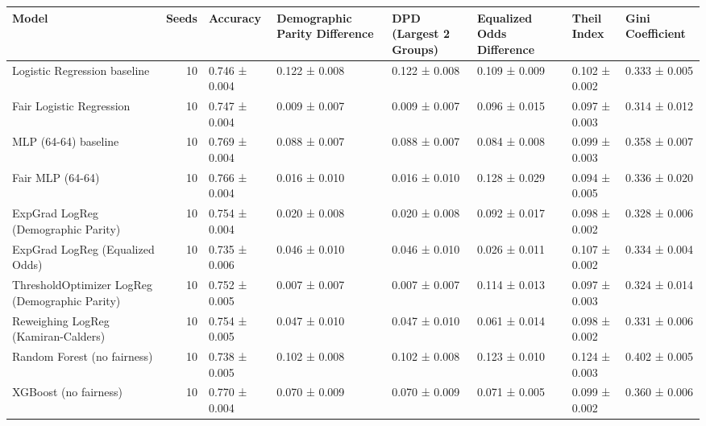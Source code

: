 \begin{tabular}{lrllllll}
\toprule
Model & Seeds & Accuracy & Demographic Parity Difference & DPD (Largest 2 Groups) & Equalized Odds Difference & Theil Index & Gini Coefficient \\
\midrule
Logistic Regression baseline & 10 & 0.746 ± 0.004 & 0.122 ± 0.008 & 0.122 ± 0.008 & 0.109 ± 0.009 & 0.102 ± 0.002 & 0.333 ± 0.005 \\
Fair Logistic Regression & 10 & 0.747 ± 0.004 & 0.009 ± 0.007 & 0.009 ± 0.007 & 0.096 ± 0.015 & 0.097 ± 0.003 & 0.314 ± 0.012 \\
MLP (64-64) baseline & 10 & 0.769 ± 0.004 & 0.088 ± 0.007 & 0.088 ± 0.007 & 0.084 ± 0.008 & 0.099 ± 0.003 & 0.358 ± 0.007 \\
Fair MLP (64-64) & 10 & 0.766 ± 0.004 & 0.016 ± 0.010 & 0.016 ± 0.010 & 0.128 ± 0.029 & 0.094 ± 0.005 & 0.336 ± 0.020 \\
ExpGrad LogReg (Demographic Parity) & 10 & 0.754 ± 0.004 & 0.020 ± 0.008 & 0.020 ± 0.008 & 0.092 ± 0.017 & 0.098 ± 0.002 & 0.328 ± 0.006 \\
ExpGrad LogReg (Equalized Odds) & 10 & 0.735 ± 0.006 & 0.046 ± 0.010 & 0.046 ± 0.010 & 0.026 ± 0.011 & 0.107 ± 0.002 & 0.334 ± 0.004 \\
ThresholdOptimizer LogReg (Demographic Parity) & 10 & 0.752 ± 0.005 & 0.007 ± 0.007 & 0.007 ± 0.007 & 0.114 ± 0.013 & 0.097 ± 0.003 & 0.324 ± 0.014 \\
Reweighing LogReg (Kamiran-Calders) & 10 & 0.754 ± 0.005 & 0.047 ± 0.010 & 0.047 ± 0.010 & 0.061 ± 0.014 & 0.098 ± 0.002 & 0.331 ± 0.006 \\
Random Forest (no fairness) & 10 & 0.738 ± 0.005 & 0.102 ± 0.008 & 0.102 ± 0.008 & 0.123 ± 0.010 & 0.124 ± 0.003 & 0.402 ± 0.005 \\
XGBoost (no fairness) & 10 & 0.770 ± 0.004 & 0.070 ± 0.009 & 0.070 ± 0.009 & 0.071 ± 0.005 & 0.099 ± 0.002 & 0.360 ± 0.006 \\
\bottomrule
\end{tabular}
